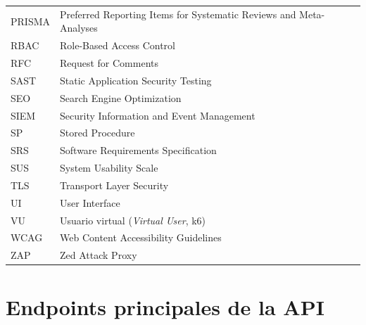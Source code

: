 \begin{longtable}{@{}ll@{}}
    PRISMA & Preferred Reporting Items for Systematic Reviews and Meta-Analyses \\
    RBAC & Role-Based Access Control \\
    RFC & Request for Comments \\
    SAST & Static Application Security Testing \\
    SEO & Search Engine Optimization \\
    SIEM & Security Information and Event Management \\
    SP & Stored Procedure \\
    SRS & Software Requirements Specification \\
    SUS & System Usability Scale \\
    TLS & Transport Layer Security \\
    UI & User Interface \\
    VU & Usuario virtual (\emph{Virtual User}, k6) \\
    WCAG & Web Content Accessibility Guidelines \\
    ZAP & Zed Attack Proxy \\
\end{longtable}
\normalsize

\section{Endpoints principales de la API}

